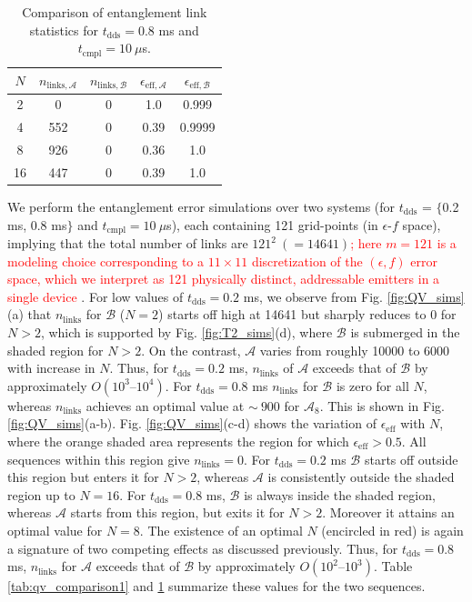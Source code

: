 \documentclass[%
 reprint,
 superscriptaddress,
 amsmath,amssymb,
 aps,
 prx,
]{revtex4-2}
\newcommand{\rev}[1]{\textcolor{red}{#1}}
\begin{document}
\begin{table}[h]
\centering
\caption{Comparison of entanglement link statistics for  $t_{\text{dds}}=0.8$ ms and $t_{\text{cmpl}}=10~\mu$s.
}
\begin{tabular}{|c| c| c | c | c|}
\hline
$N$ & $n_{\text{links},\mathcal{A}}$ & $n_{\text{links},\mathcal{B}}$ & $\epsilon_{\text{eff},\mathcal{A}}$ & $\epsilon_{\text{eff},\mathcal{B}}$\\
\hline
\rule{0pt}{2.5ex}
2   & 0  & 0 & 1.0 & 0.999\\
\hline
\rule{0pt}{2.5ex}
4   & 552  & 0 & 0.39 & 0.9999\\
\hline
\rule{0pt}{2.5ex}
8   & 926  & 0 & 0.36 & 1.0\\
\hline
\rule{0pt}{2.5ex}
16   & 447  & 0 & 0.39 & 1.0\\
\hline
\end{tabular}
\label{tab:qv_comparison2}
\end{table}

We perform the entanglement error simulations over two systems (for $t_{\text{dds}}$ = $\{$0.2 ms, 0.8 ms$\}$ and $t_{\text{cmpl}}=10~\mu$s), each containing 121 grid-points (in $\epsilon$-$f$ space), implying that the total number of links are $121^2~(= 14641)$\rev{; here $m=121$ is a modeling choice corresponding to a $11 \times 11$ discretization of the $(\epsilon,f)$ error space, which we interpret as 121 physically distinct, addressable emitters in a single device \cite{PhysRevB.97.205444, PhysRevLett.123.183602, wan_large-scale_2020, PhysRevX.9.031022}}. For low values of $t_{\text{dds}}=0.2$ ms, we observe from Fig. \ref{fig:QV_sims}(a) that $n_{\text{links}}$ for $\mathcal{B}$ ($N=2$) starts off high at 14641 but sharply reduces to 0 for $N>2$, which is supported by Fig. \ref{fig:T2_sims}(d), where $\mathcal{B}$ is submerged in the shaded region for $N>2$. On the contrast, $\mathcal{A}$ varies from roughly 10000 to 6000 with increase in $N$. Thus, for $t_{\text{dds}}= 0.2$ ms, $n_{\text{links}}$ of $\mathcal{A}$ exceeds that of $\mathcal{B}$ by approximately $O(10^3\text{--}10^4)$. For $t_{\text{dds}}=0.8$ ms $n_{\text{links}}$ for $\mathcal{B}$ is zero for all $N$, whereas $n_{\text{links}}$ achieves an optimal value at $\sim~900$ for $\mathcal{A}_8$. This is shown in Fig. \ref{fig:QV_sims}(a-b). Fig. \ref{fig:QV_sims}(c-d) shows the variation of $\epsilon_{\text{eff}}$ with $N$, where the orange shaded area represents the region for which $\epsilon_{\text{eff}}>0.5$. All sequences within this region give $n_{\text{links}}=0$. For $t_{\text{dds}}=0.2$ ms $\mathcal{B}$ starts off outside this region but enters it for $N>2$, whereas $\mathcal{A}$ is consistently outside the shaded region up to $N =16$. For $t_{\text{dds}}=0.8$ ms, $\mathcal{B}$ is always inside the shaded region, whereas $\mathcal{A}$ starts from this region, but exits it for $N>2$. Moreover it attains an optimal value for $N=8$. The existence of an optimal $N$ (encircled in red) is again a signature of two competing effects as discussed previously. Thus, for $t_{\text{dds}}= 0.8$ ms, $n_{\text{links}}$ for $\mathcal{A}$ exceeds that of $\mathcal{B}$ by approximately $O(10^2\text{--}10^3)$. Table \ref{tab:qv_comparison1} and \ref{tab:qv_comparison2} summarize these values for the two sequences.
\end{document}
